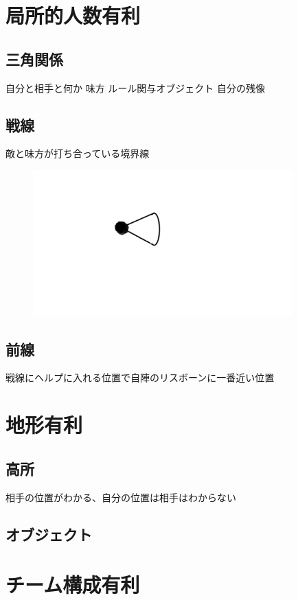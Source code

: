 \documentclass[a4paper,11pt]{jsbook}
\begin{document}
\section{局所的人数有利}
\subsection{三角関係}
自分と相手と何か
味方
ルール関与オブジェクト
自分の残像



\subsection{戦線}
敵と味方が打ち合っている境界線
\begin{figure}[h]
  \begin{center}
    \includegraphics[width=10cm]{resoource/player.png}
  \end{center}
\end{figure}

\subsection{前線}
戦線にヘルプに入れる位置で自陣のリスボーンに一番近い位置

\section{地形有利}
\subsection{高所}
相手の位置がわかる、自分の位置は相手はわからない

\subsection{オブジェクト}
\section{チーム構成有利}
\end{document}
